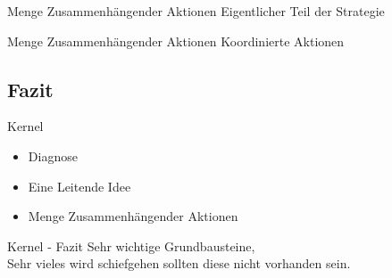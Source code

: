 \begin{frame}[c]{Menge Zusammenhängender Aktionen}
    \Huge
    Eigentlicher Teil der Strategie
\end{frame}


\begin{frame}[c]{Menge Zusammenhängender Aktionen}
    \Huge
    Koordinierte Aktionen
\end{frame}


\subsection{Fazit}


\begin{frame}[c]{Kernel}
    \Large
    \begin{itemize}
            \pause
        \item Diagnose
            \pause
        \item Eine Leitende Idee
            \pause
        \item Menge Zusammenhängender Aktionen
    \end{itemize}
\end{frame}


\begin{frame}[c]{Kernel - Fazit}
    \Large
    Sehr wichtige Grundbausteine, \\
    Sehr vieles wird schiefgehen sollten diese nicht vorhanden sein.
\end{frame}






